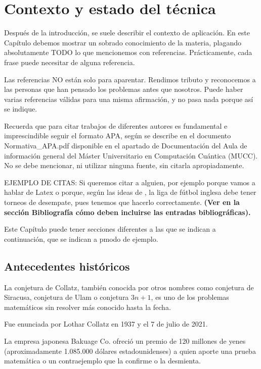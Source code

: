 \chapter{Contexto y estado del técnica}

Después de la introducción, se suele describir el contexto de aplicación. En este Capítulo debemos mostrar un sobrado conocimiento de la materia, plagando absolutamente TODO lo que mencionemos con referencias. Prácticamente, cada frase puede necesitar de alguna referencia.

Las referencias NO están solo para aparentar. Rendimos tributo y reconocemos a las personas que han pensado los problemas antes que nosotros. Puede haber varias referencias válidas para una misma afirmación, y no pasa nada porque así se indique.

Recuerda que para citar trabajos de diferentes autores es fundamental e imprescindible seguir el formato APA, según se describe en el documento Normativa\_APA.pdf disponible en el apartado de Documentación del Aula de información general del Máster Universitario en Computación Cuántica (MUCC). No se debe mencionar, ni utilizar ninguna fuente, sin citarla apropiadamente.

EJEMPLO DE CITAS: Si queremos citar a alguien, por ejemplo porque vamos a hablar de Latex \citep{lamport1994} o porque, según las ideas de \cite{ackerman2017}, la liga de fútbol inglesa debe tener torneos de desempate, pues tenemos que hacerlo correctamente. {\bf{(Ver en la sección Bibliografía cómo deben incluirse las entradas bibliográficas).}}

Este Capítulo puede tener secciones diferentes a las que se indican a continuación, que se indican a pmodo de ejemplo.

\section{Antecedentes históricos}
La conjetura de Collatz, también conocida por otros nombres como conjetura de Siracusa, conjetura de Ulam o conjetura $3n+1$, es uno de los problemas matemáticos sin resolver más conocido hasta la fecha.

Fue enunciada por Lothar Collatz en 1937 y el 7 de julio de 2021.

La empresa japonesa Bakuage Co. ofreció un premio de 120 millones de yenes (aproximadamente 1.085.000 dólares estadounidenses) a quien aporte una prueba matemática o un contraejemplo que la confirme o la desmienta.

